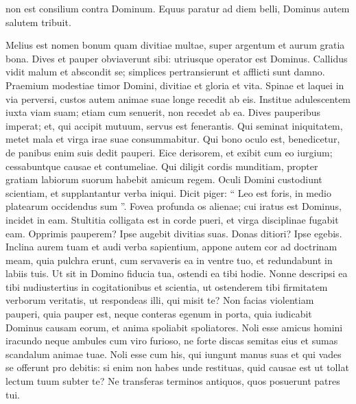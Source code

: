 \begin{biblechapter}
\begin{biblechapter}
\begin{biblechapter}
\begin{biblechapter}
\begin{biblechapter}
\begin{biblechapter}
\begin{biblechapter}
\begin{biblechapter}
\begin{biblechapter}
\begin{biblechapter}
\begin{biblechapter}
\begin{biblechapter}
\begin{biblechapter}
\begin{biblechapter}
\begin{biblechapter}
\begin{biblechapter}
\begin{biblechapter}
\begin{biblechapter}
\begin{biblechapter}
\begin{biblechapter}
\begin{biblechapter}
 non est consilium contra Dominum.
 \verse Equus paratur ad diem belli,
 Dominus autem salutem tribuit.
 
\begin{biblechapter}
 \verse Melius est nomen bonum quam divitiae multae,
 super argentum et aurum gratia bona.
 \verse Dives et pauper obviaverunt sibi:
 utriusque operator est Dominus.
 \verse Callidus vidit malum et abscondit se;
 simplices pertransierunt et afflicti sunt damno.
 \verse Praemium modestiae timor Domini,
 divitiae et gloria et vita.
 \verse Spinae et laquei in via perversi,
 custos autem animae suae longe recedit ab eis.
 \verse Institue adulescentem iuxta viam suam;
 etiam cum senuerit, non recedet ab ea.
 \verse Dives pauperibus imperat;
 et, qui accipit mutuum, servus est fenerantis.
 \verse Qui seminat iniquitatem, metet mala
 et virga irae suae consummabitur.
 \verse Qui bono oculo est, benedicetur,
 de panibus enim suis dedit pauperi.
 \verse Eice derisorem, et exibit cum eo iurgium;
 cessabuntque causae et contumeliae.
 \verse Qui diligit cordis munditiam,
 propter gratiam labiorum suorum habebit amicum regem.
 \verse Oculi Domini custodiunt scientiam,
 et supplantantur verba iniqui.
 \verse Dicit piger: “ Leo est foris,
 in medio platearum occidendus sum ”.
 \verse Fovea profunda os alienae;
 cui iratus est Dominus, incidet in eam.
 \verse Stultitia colligata est in corde pueri,
 et virga disciplinae fugabit eam.
 \verse Opprimis pauperem? Ipse augebit divitias suas.
 Donas ditiori? Ipse egebis.
 \verse Inclina aurem tuam et audi verba sapientium,
 appone autem cor ad doctrinam meam,
 \verse quia pulchra erunt, cum servaveris ea in ventre tuo,
 et redundabunt in labiis tuis.
 \verse Ut sit in Domino fiducia tua,
 ostendi ea tibi hodie.
 \verse Nonne descripsi ea tibi nudiustertius
 in cogitationibus et scientia,
 \verse ut ostenderem tibi firmitatem verborum veritatis,
 ut respondeas illi, qui misit te?
 \verse Non facias violentiam pauperi, quia pauper est,
 neque conteras egenum in porta,
 \verse quia iudicabit Dominus causam eorum,
 et anima spoliabit spoliatores.
 \verse Noli esse amicus homini iracundo
 neque ambules cum viro furioso,
 \verse ne forte discas semitas eius
 et sumas scandalum animae tuae.
 \verse Noli esse cum his, qui iungunt manus suas
 et qui vades se offerunt pro debitis:
 \verse si enim non habes unde restituas,
 quid causae est ut tollat lectum tuum subter te?
 \verse Ne transferas terminos antiquos,
 quos posuerunt patres tui.

\end{biblechapter}
\end{biblechapter}
\end{biblechapter}
\end{biblechapter}
\end{biblechapter}
\end{biblechapter}
\end{biblechapter}
\end{biblechapter}
\end{biblechapter}
\end{biblechapter}
\end{biblechapter}
\end{biblechapter}
\end{biblechapter}
\end{biblechapter}
\end{biblechapter}
\end{biblechapter}
\end{biblechapter}
\end{biblechapter}
\end{biblechapter}
\end{biblechapter}
\end{biblechapter}
\end{biblechapter}
